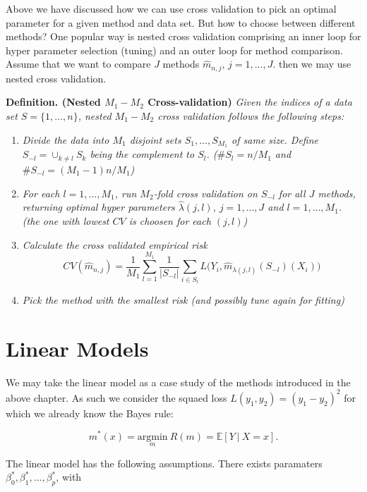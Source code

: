 \documentclass[
]{book}
\providecommand{\tightlist}{%
  \setlength{\itemsep}{0pt}\setlength{\parskip}{0pt}}
\begin{document}
Above we have discussed how we can use cross validation to pick an optimal parameter for a given method and data set. But how to choose between different methods? One popular way is nested cross validation comprising an inner loop for hyper parameter selection (tuning) and an outer loop for method comparison. Assume that we want to compare \(J\) methods \(\hat{m}_{n,j}\), \(j=1,...,J\). then we may use nested cross validation.

\textbf{Definition. (Nested \(M_1-M_2\) Cross-validation)} \emph{Given the indices of a data set \(S=\{1,...,n\}\), nested \(M_1-M_2\) cross validation follows the following steps:}

\begin{enumerate}
\def\labelenumi{\arabic{enumi}.}
\tightlist
\item
  \emph{Divide the data into \(M_1\) disjoint sets \(S_1,...,S_{M_1}\) of same size. Define \(S_{-l}=\cup_{k\ne l}S_k\) being the complement to \(S_l\). (\(\#S_l=n/M_1\) and \(\#S_{-l}=(M_1-1)n/M_1\))}
\item
  \emph{For each \(l=1,...,M_1\), run \(M_2\)-fold cross validation on \(S_{-l}\) for all \(J\) methods, returning optimal hyper parameters \(\hat{\lambda}(j,l)\), \(j=1,...,J\) and \(l=1,...,M_1\). (the one with lowest \(CV\) is choosen for each \((j,l)\))}
\item
  \emph{Calculate the cross validated empirical risk}
  \[
    CV(\hat{m}_{n,j})=\frac{1}{M_1}\sum_{l=1}^{M_1}\frac{1}{\vert S_{-l}\vert}\sum_{i\in S_l}L\big(Y_i,\hat{m}_{\lambda(j,l)}(S_{-l})(X_i)\big)
    \]
\item
  \emph{Pick the method with the smallest risk (and possibly tune again for fitting)}
\end{enumerate}

\hypertarget{linear-models}{%
\section{Linear Models}\label{linear-models}}

We may take the linear model as a case study of the methods introduced in the above chapter. As such we consider the squaed loss \(L(y_1,y_2)=(y_1-y_2)^2\) for which we already know the Bayes rule:

\[
m^*(x)=\underset{m}{\text{argmin}}\ R(m)=\mathbb{E}[Y\ \vert\ X=x].
\]

The linear model has the following assumptions. There exists paramaters \(\beta_0^*,\beta_1^*,...,\beta_p^*\), with
\end{document}
